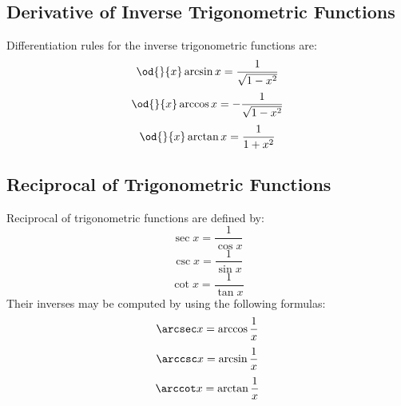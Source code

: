 \subsection{Derivative of Inverse Trigonometric Functions}
	Differentiation rules for the inverse trigonometric functions are:
	\[\od{}{x} \arcsin x = \frac{1}{\sqrt{1-x^2}}\]
	\[\od{}{x} \arccos x = -\frac{1}{\sqrt{1-x^2}}\]
	\[\od{}{x} \arctan x = \frac{1}{1+x^2}\]
\subsection{Reciprocal of Trigonometric Functions}
	Reciprocal of trigonometric functions are defined by:
	\[\sec x = \frac{1}{\cos x}\]
	\[\csc x = \frac{1}{\sin x}\]
	\[\cot x = \frac{1}{\tan x}\]
	Their inverses may be computed by using the following formulas:
	\[\arcsec x = \arccos \frac{1}{x}\]
	\[\arccsc x = \arcsin \frac{1}{x}\]
	\[\arccot x = \arctan \frac{1}{x}\]
